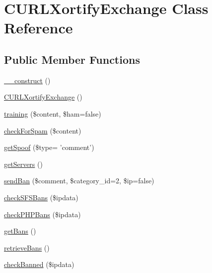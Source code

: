 \hypertarget{class_c_u_r_l_xortify_exchange}{\section{C\-U\-R\-L\-Xortify\-Exchange Class Reference}
\label{class_c_u_r_l_xortify_exchange}
}
\subsection*{Public Member Functions}
\begin{DoxyCompactItemize}
\item 
\hyperlink{class_c_u_r_l_xortify_exchange_a095c5d389db211932136b53f25f39685}{\-\_\-\-\_\-construct} ()
\item 
\hyperlink{class_c_u_r_l_xortify_exchange_a3e47d53032637da1adeb1e4c5b1d4483}{C\-U\-R\-L\-Xortify\-Exchange} ()
\item 
\hyperlink{class_c_u_r_l_xortify_exchange_a3b3be735e633ba330c6b5d086aa508cd}{training} (\$content, \$ham=false)
\item 
\hyperlink{class_c_u_r_l_xortify_exchange_a7a4f53c3841dc7806455261af557d514}{check\-For\-Spam} (\$content)
\item 
\hyperlink{class_c_u_r_l_xortify_exchange_ae7926cba79660f77479306100f492c03}{get\-Spoof} (\$type= 'comment')
\item 
\hyperlink{class_c_u_r_l_xortify_exchange_a882f365bc81e207dc2123ef707735e82}{get\-Servers} ()
\item 
\hyperlink{class_c_u_r_l_xortify_exchange_a0293acfa4afe0cb5b2816352a35d8ca7}{send\-Ban} (\$comment, \$category\-\_\-id=2, \$ip=false)
\item 
\hyperlink{class_c_u_r_l_xortify_exchange_a985a563a84e3e5c54694fcce192bda53}{check\-S\-F\-S\-Bans} (\$ipdata)
\item 
\hyperlink{class_c_u_r_l_xortify_exchange_aeb1bf9aaee4718870adbd07333490aaf}{check\-P\-H\-P\-Bans} (\$ipdata)
\item 
\hyperlink{class_c_u_r_l_xortify_exchange_aea26db2906896833d32445a698fc4cdc}{get\-Bans} ()
\item 
\hyperlink{class_c_u_r_l_xortify_exchange_a4af29af927aae9aada97ef0c2cd08fa1}{retrieve\-Bans} ()
\item 
\hyperlink{class_c_u_r_l_xortify_exchange_ae41df0f26620b727f7f63342648f6474}{check\-Banned} (\$ipdata)
\end{DoxyCompactItemize}
